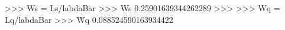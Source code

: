
>>> Ws = Ls/labdaBar
>>> Ws
0.25901639344262289
>>>
>>> Wq = Lq/labdaBar
>>> Wq
0.088524590163934422

